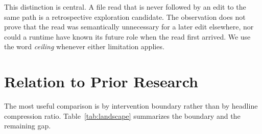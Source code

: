 \documentclass[10pt,twocolumn]{article}
\begin{document}
This distinction is central.  A file read that is never followed by an edit to the same path is a
retrospective exploration candidate.  The observation does not prove that the read was semantically
unnecessary for a later edit elsewhere, nor could a runtime have known its future role when the read
first arrived.  We use the word \emph{ceiling} whenever either limitation applies.

\section{Relation to Prior Research}

The most useful comparison is by intervention boundary rather than by headline compression ratio.
Table~\ref{tab:landscape} summarizes the boundary and the remaining gap.
\end{document}
